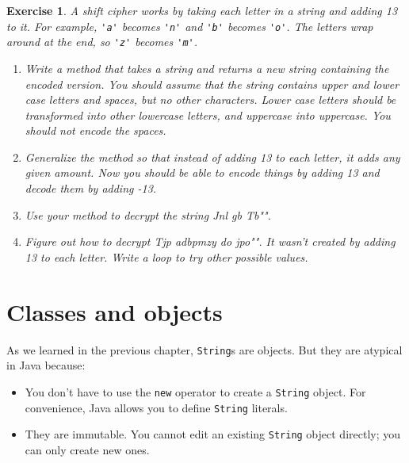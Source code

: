 \documentclass[12pt]{book}
\theoremstyle{exercise}
\newtheorem{exercise}{Exercise}[chapter]
\newcommand{\java}[1]{\verb"#1"}
\newcommand{\java}[1]{\lstinline{#1}} %
\begin{document}
\begin{exercise}

A {\em shift cipher} works by taking each letter in a string and adding 13 to it.
For example, \java{'a'} becomes \java{'n'} and \java{'b'} becomes \java{'o'}.
The letters wrap around at the end, so \java{'z'} becomes \java{'m'}.

\begin{enumerate}

\item Write a method that takes a string and returns a new string containing the encoded version.
You should assume that the string contains upper and lower case letters and spaces, but no other characters.
Lower case letters should be transformed into other lowercase letters, and uppercase into uppercase.
You should not encode the spaces.

\item Generalize the method so that instead of adding 13 to each letter, it adds any given amount.
Now you should be able to encode things by adding 13 and decode them by adding -13.

\item Use your method to decrypt the string \java{"Jnl gb Tb"}.

\item Figure out how to decrypt \java{"Tjp adbpmzy do jpo"}.
It wasn't created by adding 13 to each letter.
Write a loop to try other possible values.

\end{enumerate}

\end{exercise}


\chapter{Classes and objects}
\label{objects}


As we learned in the previous chapter, \java{String}s are objects.
But they are atypical in Java because:

\begin{itemize}

\item You don't have to use the \java{new} operator to create a \java{String} object.
For convenience, Java allows you to define \java{String} literals.

\item They are immutable.
You cannot edit an existing \java{String} object directly; you can only create new ones.

\end{itemize}
\end{document}
